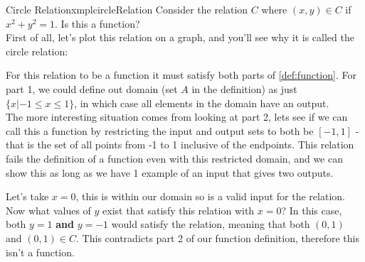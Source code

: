 \begin{exmpl}[label={exmpl:circleRelation}]{Circle Relation}{xmplcircleRelation}
    Consider the relation $C$ where $(x,y) \in C$ if $x^2 + y^2 = 1$. Is this a function?\\

    First of all, let's plot this relation on a graph, and you'll see why it is called the circle relation:
    \begin{center}
    \end{center}
    For this relation to be a function it must satisfy both parts of \cref{def:function}. For part 1, we could define out domain (set $A$ in the definition) as just $\{x | -1 \leq x \leq 1\}$, in which case all elements in the domain have an output.\\
    The more interesting situation comes from looking at part 2, lets see if we can call this a function by restricting the input and output sets to both be $[-1,1]$ - that is the set of all points from -1 to 1 inclusive of the endpoints. This relation fails the definition of a function even with this restricted domain, and we can show this as long as we have 1 example of an input that gives two outputs.

    Let's take $x = 0$, this is within our domain so is a valid input for the relation. Now what values of $y$ exist that satisfy this relation with $x = 0$? In this case, both $y = 1$ \textbf{and} $y = -1$ would satisfy the relation, meaning that both $(0,1)$ and $(0,1) \in C$. This contradicts part 2 of our function definition, therefore this isn't a function.
\end{exmpl}
